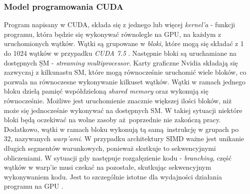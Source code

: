\subsubsection{Model programowania CUDA}
Program napisany w CUDA, składa się z jednego lub więcej
\textit{kernel'a} - funkcji programu, która będzie się wykonywać równolegle na GPU, na każdym z uruchomionych wątków.
Wątki są grupowane w \textit{bloki}, które mogą się składać z 1 do 1024 wątków w przypadku \textit{CUDA 7.5} \cite{CudaDeveloper}.
Następnie bloki są uruchamiane na dostępnych \b{SM} - \textit{streaming multiprocessor}.
Karty graficzne Nvidia składają się zazwyczaj z kilkunastu SM, które mogą równocześnie uruchomić wiele
bloków, co pozwala na równoczesne wykonywanie kilkuset wątków.
Wątki w ramach jednego bloku dzielą pamięć współdzieloną \textit{shared memory} oraz wykonują się równocześnie.
Możliwe jest uruchomienie znacznie większej ilości bloków, niż może się jednocześnie wykonywać na dostępnych SM.
W takiej sytuacji niektóre bloki będą oczekiwać na wolne zasoby aż poprzednie nie zakończą pracy.
Dodatkowo, wątki w ramach bloku wykonują tą samą instrukcję w grupach po 32,
nazywanych \textit{warp'ami}.
W przypadku architektury SIMD ważne jest unikanie długich segmentów
warunkowych, ponieważ skutkuje to sekwencyjnymi obliczeniami.
W sytuacji gdy następuje rozgałęzienie kodu - \textit{branching},
część wątków w warp'ie musi czekać na pozostałe, skutkując sekwencyjnym wykonywaniem kodu.
Jest to szczególnie istotne dla wydajności działania programu na GPU \cite{CudaDeveloper}.
